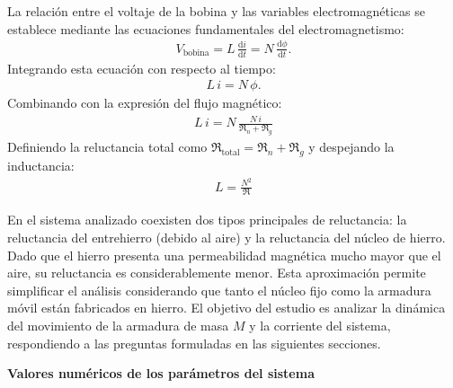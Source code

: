 \documentclass[
  11pt,
  letterpaper,
   addpoints,
   answers
  ]{exam}
\newcommand{\Rel}{\mathfrak{R}} %
\begin{document}
La relación entre el voltaje de la bobina y las variables electromagnéticas se establece mediante las ecuaciones fundamentales del electromagnetismo:
\begin{align}
  V_{\text{bobina}} = L\,\frac{\mathrm{d}i}{\mathrm{d}t} = N\,\frac{\mathrm{d}\phi}{\mathrm{d}t}.
\end{align}
Integrando esta ecuación con respecto al tiempo:
\begin{align}
  L\,i = N\,\phi.
\end{align}
Combinando con la expresión del flujo magnético:
\begin{align}
  L\,i = N\, \frac{N\, i}{\Rel_n + \Rel_g}
\end{align}
Definiendo la reluctancia total como $\Rel_{\text{total}} = \Rel_n + \Rel_g$ y despejando la inductancia:
\begin{align}
  L = \frac{N^2}{\Rel}
\end{align}

En el sistema analizado coexisten dos tipos principales de reluctancia: la reluctancia del entrehierro (debido al aire) y la reluctancia del núcleo de hierro. Dado que el hierro presenta una permeabilidad magnética mucho mayor que el aire, su reluctancia es considerablemente menor. Esta aproximación permite simplificar el análisis considerando que tanto el núcleo fijo como la armadura móvil están fabricados en hierro. El objetivo del estudio es analizar la dinámica del movimiento de la armadura de masa $M$ y la corriente del sistema, respondiendo a las preguntas formuladas en las siguientes secciones.
\newpage
\hrulefill
\begin{center}
\textbf{Valores numéricos de los parámetros del sistema}
\end{center}
\end{document}

